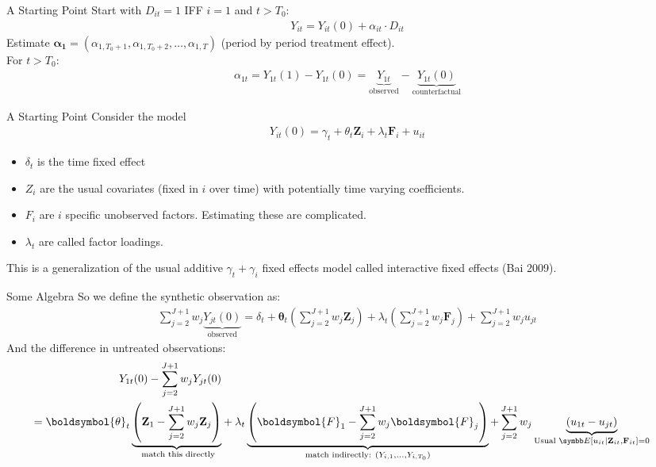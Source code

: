 \documentclass[aspectratio=169,11pt]{beamer}
\begin{document}
\begin{frame}{A Starting Point}
Start with $D_{it} =1$ IFF $i =1$ and $t > T_0$:
\begin{align*}
Y_{it} = Y_{it}(0)  + \alpha_{it} \cdot D_{it}
\end{align*}
Estimate $\mathbf{\boldsymbol{\alpha}_1} =(\alpha_{1, T_0+1},\alpha_{1, T_0+2},\ldots,\alpha_{1,T}) $ (period by period treatment effect).\\
 For $t > T_0$:
\begin{align*}
\alpha_{1 t}=Y_{1 t}(1)-Y_{1 t}(0)=\underbrace{Y_{1 t}}_{\text{observed}}-\underbrace{Y_{1 t}(0)}_{\text{counterfactual}}
\end{align*}

\end{frame}

\begin{frame}{A Starting Point}
Consider the model
\begin{align*}
Y_{i t}(0)=\gamma_{t}+ \theta_{t} \mathbf{Z}_{i}+\lambda_{t} \mathbf{F}_{i}+u_{i t}
\end{align*}
\begin{itemize}
\item $\delta_t$ is the time fixed effect
\item $Z_i$ are the usual covariates (fixed in $i$ over time) with potentially time varying coefficients.
\item $F_i$ are $i$ specific \alert{unobserved factors}. Estimating these are complicated.
\item $\lambda_t$ are called \alert{factor loadings}.
\end{itemize}
This is a generalization of the usual additive $\gamma_t + \gamma_i$ fixed effects model called \alert{interactive fixed effects} (Bai 2009).
\end{frame}

\begin{frame}{Some Algebra}
So we define the synthetic observation as:
\begin{align*}
\sum_{j=2}^{J+1} w_{j} \underbrace{Y_{j t}(0)}_{\text{observed}}=\delta_{t}+\boldsymbol{\theta}_{t}\left(\sum_{j=2}^{J+1} w_{j} \mathbf{Z}_{j}\right)+\lambda_{t}\left(\sum_{j=2}^{J+1} w_{j} \boldsymbol{F}_{j}\right)+\sum_{j=2}^{J+1} w_{j} u_{j t}
\end{align*}
And the difference in untreated observations:
\begin{align*}
\begin{aligned}
Y_{1 t}(0)-\sum_{j=2}^{J+1} w_{j} Y_{j t}(0)\\
=\boldsymbol{\theta}_{t} \underbrace{\left( \mathbf{Z}_{1}-\sum_{j=2}^{J+1} w_{j} \mathbf{Z}_{j} \right)}_{\text{ match this directly}} 
&+\lambda_{t} \underbrace{\left(\boldsymbol{F}_{1}-\sum_{j=2}^{J+1} w_{j} \boldsymbol{F}_{j}\right)}_{\text{match indirectly:  }  (Y_{i,1},\ldots,Y_{i,T_0})}+\sum_{j=2}^{J+1} w_{j}\underbrace{\left(u_{1 t}-u_{j t}\right)}_{\text{Usual } \E[u_{it} \mid \mathbf{Z}_{it}, \mathbf{F}_{it} ]=0}
\end{aligned}
\end{align*}
\end{frame}
\end{document}
